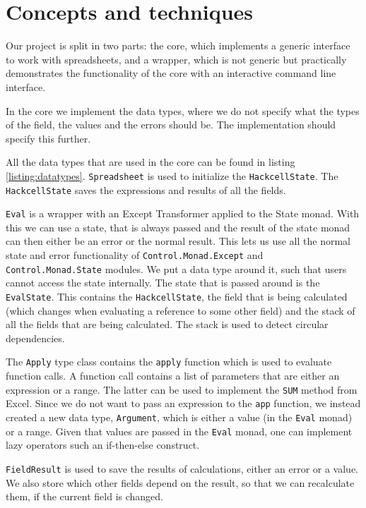\documentclass{article}
\begin{document}
	\section{Concepts and techniques}
	Our project is split in two parts: the core, which implements a generic interface to work with spreadsheets, and a wrapper, which is not generic but practically demonstrates the functionality of the core with an interactive command line interface.
	
	In the core we implement the data types, where we do not specify what the types of the field, the values and the errors should be. The implementation should specify this further.
	
	All the data types that are used in the core can be found in listing \ref{listing:datatypes}. \texttt{Spreadsheet} is used to initialize the \texttt{HackcellState}. The \texttt{HackcellState} saves the expressions and results of all the fields.
	
	\texttt{Eval} is a wrapper with an Except Transformer applied to the State monad. With this we can use a state, that is always passed and the result of the state monad can then either be an error or the normal result. This lets us use all the normal state and error functionality of \texttt{Control.Monad.Except} and \texttt{Control.Monad.State} modules. We put a data type around it, such that users cannot access the state internally. The state that is passed around is the \texttt{EvalState}. This contains the \texttt{HackcellState}, the field that is being calculated (which changes when evaluating a reference to some other field) and the stack of all the fields that are being calculated. The stack is used to detect circular dependencies.
	
	The \texttt{Apply} type class contains the \texttt{apply} function which is used to evaluate function calls. A function call contains a list of parameters that are either an expression or a range. The latter can be used to implement the \texttt{SUM} method from Excel. Since we do not want to pass an expression to the \texttt{app} function, we instead created a new data type, \texttt{Argument}, which is either a value (in the \texttt{Eval} monad) or a range. Given that values are passed in the \texttt{Eval} monad, one can implement lazy operators such an if-then-else construct.

	\texttt{FieldResult} is used to save the results of calculations, either an error or a value. We also store which other fields depend on the result, so that we can recalculate them, if the current field is changed.
	
\end{document}
